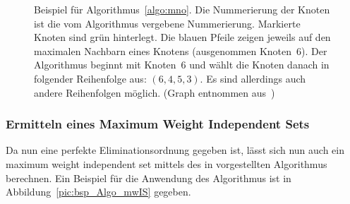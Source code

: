 \begin{figure}[htbp]
    \centering
    \caption[Beispiel für Algorithmus~\ref{algo:mno}]{Beispiel für Algorithmus~\ref{algo:mno}. Die Nummerierung der Knoten ist die vom Algorithmus vergebene Nummerierung. Markierte Knoten sind grün hinterlegt. Die blauen Pfeile zeigen jeweils auf den maximalen Nachbarn eines Knotens (ausgenommen Knoten~$6$). Der Algorithmus beginnt mit Knoten~$6$ und wählt die Knoten danach in folgender Reihenfolge aus: $(6,4,5,3)$. Es sind allerdings auch andere Reihenfolgen möglich. (Graph entnommen aus~\cite{Frank1976})}
    \label{pic:bsp_Algo_MNO}
\end{figure}

\subsubsection{Ermitteln eines Maximum Weight Independent Sets}
Da nun eine perfekte Eliminationsordnung gegeben ist, lässt sich nun auch ein maximum weight independent set mittels des in \cite{Frank1976} vorgestellten Algorithmus berechnen. Ein Beispiel für die Anwendung des Algorithmus ist in Abbildung~\ref{pic:bsp_Algo_mwIS} gegeben.


